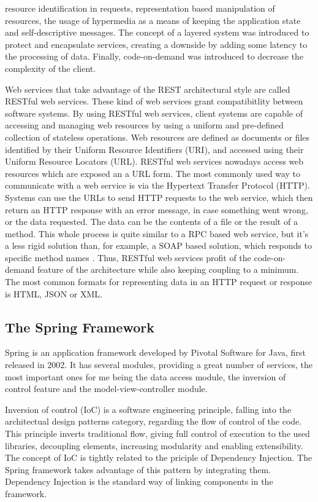 \documentclass[12pt,a4paper,twoside]{report}
\begin{document}
resource identification in requests, representation based manipulation of resources, the usage of hypermedia as a means of keeping the application state and self-descriptive messages. The concept of a layered system was introduced to protect and encapsulate services, creating a downside by adding some latency to the processing of data. Finally, code-on-demand was introduced to decrease the complexity of the client.

Web services that take advantage of the REST architectural style are called RESTful web services. These kind of web services grant compatibitlity between software systems. By using RESTful web services, client systems are capable of accessing and managing web resources by using a uniform and pre-defined collection of stateless operations. Web resources are defined as documents or files identified by their Uniform Resource Identifiers (URI), and accessed using their Uniform Resource Locators (URL). RESTful web services nowadays access web resources which are exposed an a URL form. The most commonly used way to communicate with a web service is via the Hypertext Transfer Protocol (HTTP). Systems can use the URLs to send HTTP requests to the web service, which then return an HTTP response with an error message, in case something went wrong, or the data requested. The data can be the contents of a file or the result of a method. This whole process is quite similar to a RPC based web service, but it's a less rigid solution than, for example, a SOAP based solution, which responds to specific method names \cite{resftul_web_services}. Thus, RESTful web services profit of the code-on-demand feature of the architecture while also keeping coupling to a minimum. The most common formats for representing data in an HTTP request or response is HTML, JSON or XML.


\subsection{The Spring Framework}
Spring is an application framework developed by Pivotal Software for Java, first released in 2002. It has several modules, providing a great number of services, the most important ones for me being the data access module, the inversion of control feature and the model-view-controller module.

Inversion of control (IoC) is a software engineering principle, falling into the architectual design patterns category, regarding the flow of control of the code. This principle inverts traditional flow, giving full control of execution to the used libraries, decoupling elements, increasing modularity and enabling extensibility. The concept of IoC is tightly related to the priciple of Dependency Injection. The Spring framework takes advantage of this pattern by integrating them. Dependency Injection is the standard way of linking components in the framework.
\end{document}
